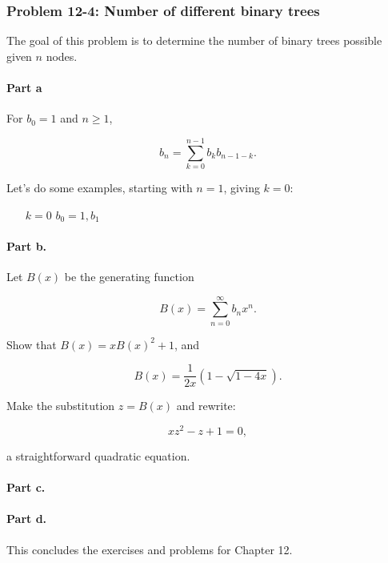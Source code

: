 \documentclass{article}
\begin{document}
\subsubsection{Problem 12-4: Number of different binary trees}

The goal of this problem is to determine the number of binary
trees possible given $n$ nodes.

\paragraph{Part a} For $b_0 = 1$ and $n \geq 1$,

\[
b_n = \sum_{k=0}^{n-1} b_kb_{n-1-k}.
\]

Let's do some examples, starting with $n = 1$, giving $k = 0$:

\begin{itemize}
\item [$k=0$] $b_0 = 1, b_1$
\end{itemize}

\paragraph{Part b.} Let $B(x)$ be the generating function

\begin{equation}
B(x) = \sum_{n=0}^{\infty}b_nx^n.
\end{equation}

Show that $B(x) = xB(x)^2 + 1$, and

\begin{equation}
B(x) = \frac{1}{2x}(1-\sqrt{1-4x}).
\end{equation}

Make the substitution $z = B(x)$ and rewrite:

\begin{equation}
  xz^2 - z + 1 = 0,
\end{equation}

a straightforward quadratic equation.

\paragraph{Part c.}

\paragraph{Part d.}

This concludes the exercises and problems for Chapter 12.
\end{document}
